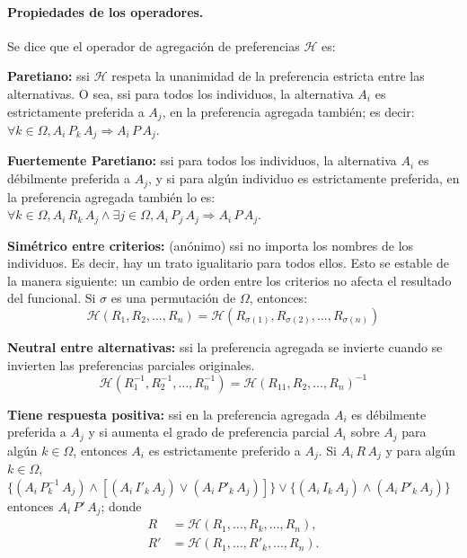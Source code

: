 \documentclass[a5paper,doc,10pt,noapacite]{apa6}
\begin{document}
{{\paragraph{Propiedades de los operadores.}

Se dice que el operador de agregación de preferencias \(\mathcal{H}\) es:

\begin{APAenumerate}
    \item \textbf{Paretiano:} ssi \(\mathcal{H}\) respeta la unanimidad de la preferencia estricta entre las alternativas. O sea, ssi para todos los individuos, la alternativa \(A_i\) es estrictamente preferida a \(A_j\), en la preferencia agregada también; es decir: \(\forall k \in \Omega, A_i \, P_k \, A_j \Rightarrow A_i \, P \, A_j\).
    
   \vspace{1\baselineskip}
    \item \textbf{Fuertemente Paretiano:} ssi para todos los individuos, la alternativa \(A_i\) es débilmente preferida a \(A_j\), y si para algún individuo es estrictamente preferida, en la preferencia agregada también lo es: \(\forall k \in \Omega, A_i \, R_k \, A_j \wedge \exists j \in \Omega,  A_i \, P_j \, A_j \Rightarrow A_i \, P \, A_j\).
    
    \vspace{1\baselineskip}
    \item \textbf{Simétrico entre criterios:} (anónimo) ssi no importa los nombres de los individuos. Es decir, hay un trato igualitario para todos ellos. Esto se estable de la manera siguiente: un cambio de orden entre los criterios no afecta el resultado del funcional. Si \(\sigma\) es una permutación de \(\Omega\), entonces:
    \[
    	\mathcal{H}(R_1, R_2, \dots, R_n) = \mathcal{H}(R_{\sigma (1)}, R_{\sigma (2)}, \dots, R_{\sigma (n)})
    \]
    
    \vspace{1\baselineskip}
    \item \textbf{Neutral entre alternativas:} ssi la preferencia agregada se invierte cuando se invierten las preferencias parciales originales.
    \[
    	\mathcal{H}(R_1^{-1}, R_2^{-1}, \dots, R_n^{-1}) = \mathcal{H}(R_{11}, R_{2}, \dots, R_{n})^{-1}
    \]
    
    \vspace{1\baselineskip}
    \item \textbf{Tiene respuesta positiva:} ssi en la preferencia agregada \(A_i\) es débilmente preferida a \(A_j\) y si aumenta el grado de preferencia parcial \(A_i\) sobre \(A_j\) para algún \(k \in \Omega\), entonces \(A_i\) es estrictamente preferido a \(A_j\). Si \(A_i \, R \, A_j\) y para algún \(k \in \Omega\), \(\{( A_i \, P_k^{-1} \, A_j) \wedge [( A_i \, I'_k \, A_j) \vee ( A_i \, P'_k \, A_j)]\} \vee \{( A_i \, I_k \, A_j) \wedge ( A_i \, P'_k \, A_j)\}\) entonces \(A_i \, P' \, A_j\); donde
\begin{align*}
	R &= \mathcal{H}(R_1, \dots, R_k, \dots, R_n) ,
	\\
	R' &= \mathcal{H}(R_1, \dots, R'_k, \dots, R_n).
\end{align*}
    

\end{APAenumerate}}}
\end{document}
